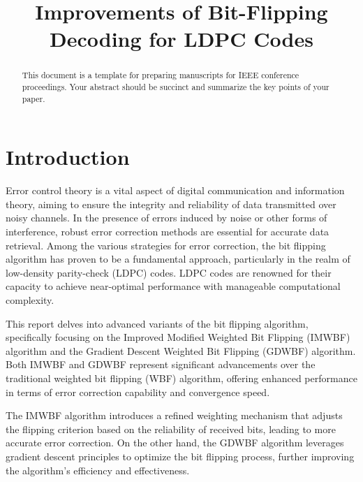 \documentclass[a4paper,conference]{IEEEtran}
\begin{document}
\title{Improvements of Bit-Flipping Decoding for LDPC Codes}

\author{
}

\maketitle

\begin{abstract}
This document is a template for preparing manuscripts for IEEE conference proceedings. Your abstract should be succinct and summarize the key points of your paper.
\end{abstract}


\section{Introduction}
Error control theory is a vital aspect of digital communication and information theory, aiming to ensure the integrity and reliability of data transmitted over noisy channels. In the presence of errors induced by noise or other forms of interference, robust error correction methods are essential for accurate data retrieval. Among the various strategies for error correction, the bit flipping algorithm has proven to be a fundamental approach, particularly in the realm of low-density parity-check (LDPC) codes. LDPC codes are renowned for their capacity to achieve near-optimal performance with manageable computational complexity.

This report delves into advanced variants of the bit flipping algorithm, specifically focusing on the Improved Modified Weighted Bit Flipping (IMWBF) algorithm and the Gradient Descent Weighted Bit Flipping (GDWBF) algorithm. Both IMWBF and GDWBF represent significant advancements over the traditional weighted bit flipping (WBF) algorithm, offering enhanced performance in terms of error correction capability and convergence speed.

The IMWBF algorithm introduces a refined weighting mechanism that adjusts the flipping criterion based on the reliability of received bits, leading to more accurate error correction. On the other hand, the GDWBF algorithm leverages gradient descent principles to optimize the bit flipping process, further improving the algorithm's efficiency and effectiveness.
\end{document}

